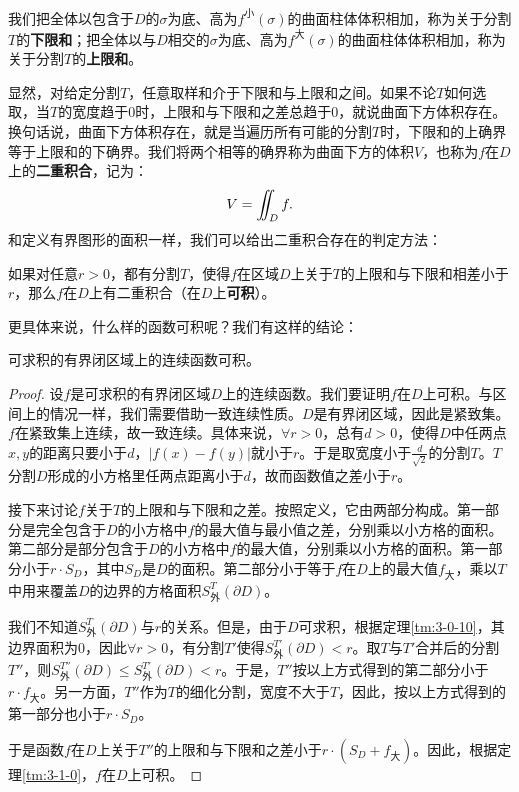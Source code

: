 \documentclass[12pt,UTF8]{ctexbook}
\begin{document}
我们把全体以包含于$D$的$\sigma$为底、高为$f^{\text{小}}(\sigma)$的曲面柱体体积相加，称为关于分割$T$的\textbf{下限和}；把全体以与$D$相交的$\sigma$为底、高为$f^{\text{大}}(\sigma)$的曲面柱体体积相加，称为关于分割$T$的\textbf{上限和}。

显然，对给定分割$T$，任意取样和介于下限和与上限和之间。如果不论$T$如何选取，当$T$的宽度趋于$0$时，上限和与下限和之差总趋于$0$，就说曲面下方体积存在。换句话说，曲面下方体积存在，就是当遍历所有可能的分割$T$时，下限和的上确界等于上限和的下确界。我们将两个相等的确界称为曲面下方的体积$V$，也称为$f$在$D$上的\textbf{二重积合}，记为：
$$ V = \int\!\!\!\!\!\int_{D} f. $$  %
和定义有界图形的面积一样，我们可以给出二重积合存在的判定方法：
\begin{tm}\label{tm:3-1-0}
    如果对任意$r>0$，都有分割$T$，使得$f$在区域$D$上关于$T$的上限和与下限和相差小于$r$，那么$f$在$D$上有二重积合（在$D$上\textbf{可积}）。
\end{tm}
更具体来说，什么样的函数可积呢？我们有这样的结论：
\begin{tm}
    可求积的有界闭区域上的连续函数可积。
\end{tm}
\begin{proof}
    设$f$是可求积的有界闭区域$D$上的连续函数。我们要证明$f$在$D$上可积。与区间上的情况一样，我们需要借助一致连续性质。$D$是有界闭区域，因此是紧致集。$f$在紧致集上连续，故一致连续。具体来说，$\forall r>0$，总有$d>0$，使得$D$中任两点$x,y$的距离只要小于$d$，$|f(x)-f(y)|$就小于$r$。于是取宽度小于$\displaystyle\frac{d}{\sqrt{2}}$的分割$T$。$T$分割$D$形成的小方格里任两点距离小于$d$，故而函数值之差小于$r$。
    
    接下来讨论$f$关于$T$的上限和与下限和之差。按照定义，它由两部分构成。第一部分是完全包含于$D$的小方格中$f$的最大值与最小值之差，分别乘以小方格的面积。第二部分是部分包含于$D$的小方格中$f$的最大值，分别乘以小方格的面积。第一部分小于$r\cdot S_D$，其中$S_D$是$D$的面积。第二部分小于等于$f$在$D$上的最大值$f_{\text{大}}$，乘以$T$中用来覆盖$D$的边界的方格面积$S_{\text{外}}^{T}(\partial D)$。

    我们不知道$S_{\text{外}}^{T}(\partial D)$与$r$的关系。但是，由于$D$可求积，根据定理\ref{tm:3-0-10}，其边界面积为$0$，因此$\forall r>0$，有分割$T'$使得$S_{\text{外}}^{T'}(\partial D)<r$。取$T$与$T'$合并后的分割$T''$，则$S_{\text{外}}^{T''}(\partial D)\leqslant S_{\text{外}}^{T'}(\partial D)<r$。于是，$T''$按以上方式得到的第二部分小于$r\cdot f_{\text{大}}$。另一方面，$T''$作为$T$的细化分割，宽度不大于$T$，因此，按以上方式得到的第一部分也小于$r\cdot S_D$。

    于是函数$f$在$D$上关于$T''$的上限和与下限和之差小于$r\cdot (S_D+f_{\text{大}})$。因此，根据定理\ref{tm:3-1-0}，$f$在$D$上可积。
\end{proof}
\end{document}
